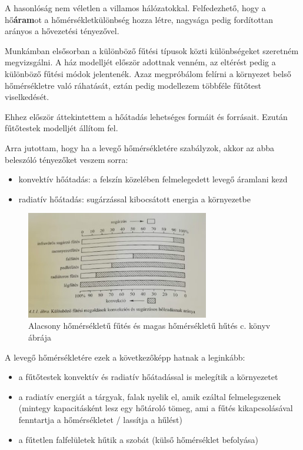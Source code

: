 A hasonlóság nem véletlen a villamos hálózatokkal. Felfedezhető, hogy a hő\textbf{áram}ot a hőmérsékletkülönbség hozza létre, nagysága pedig fordítottan arányos a hővezetési tényezővel. 


Munkámban elsősorban a különböző fűtési típusok közti különbségeket szeretném megvizsgálni. A ház modelljét először adottnak venném, az eltérést pedig a különböző fűtési módok jelentenék.
Azaz megpróbálom felírni a környezet belső hőmérsékletre való ráhatását, eztán pedig modellezem többféle fűtőtest viselkedését.

Ehhez először áttekintettem a hőátadás lehetséges formáit és forrásait.
Ezután fűtőtestek modelljét állítom fel.




\pagebreak

 Arra jutottam, hogy ha a levegő hőmérsékletére szabályzok, akkor az abba beleszóló tényezőket veszem sorra:
\begin{itemize}[noitemsep,topsep=0pt,parsep=0pt,partopsep=0pt]
	\item konvektív hőátadás: a felszín közelében felmelegedett levegő áramlani kezd
	\item radiatív hőátadás: sugárzással kibocsátott energia a környezetbe
\end{itemize}

\begin{figure}[h]
	\centering
	\includegraphics[width=8cm]{figures/konvrad}
	\caption{Alacsony hőmérsékletű fűtés és magas hőmérsékletű hűtés c. könyv ábrája}
\end{figure}


A levegő hőmérsékletére ezek a következőképp hatnak a leginkább:
\begin{itemize}[noitemsep,topsep=0pt,parsep=0pt,partopsep=0pt]
	\item a fűtőtestek konvektív és radiatív hőátadással is melegítik a környezetet
	\item a radiatív energiát a tárgyak, falak nyelik el, amik ezáltal felmelegszenek (mintegy kapacitásként lesz egy hőtároló tömeg, ami a fűtés kikapcsolásával fenntartja a hőmérsékletet / lassítja a hűlést)
	\item a fűtetlen falfelületek hűtik a szobát (külső hőmérséklet befolyása)
\end{itemize}

